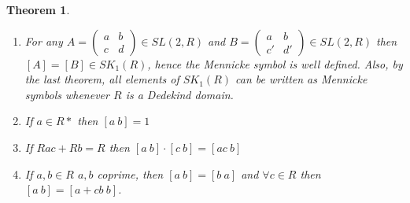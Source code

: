 \documentclass[a4paper,10pt]{article}
\newtheorem{thm}{Theorem}[subsection]
\begin{document}
\begin{thm}
\begin{enumerate}
 \item For any $A=\begin{pmatrix} a & b \\ c & d \end{pmatrix}\in SL(2,R)$ and $B=\begin{pmatrix} a & b \\ c' & d' \end{pmatrix}\in SL(2,R)$ then $[A]=[B]\in SK_{1}(R)$, hence the Mennicke symbol is well defined. Also, by the last theorem, all elements of $SK_{1}(R)$ can be written as Mennicke symbols whenever $R$ is a Dedekind domain.
 \item If $a\in R*$ then $[a\ b]=1$
 \item If $Rac+Rb=R$ then $[a\ b]\cdot [c\ b]=[ac\ b]$
 \item If $a,b\in R$ $a,b$ coprime, then $[a\ b]=[b\ a]$ and $\forall c\in R$ then $[a\ b]=[a+cb\ b]$.
\end{enumerate}
\end{thm}
\end{document}
